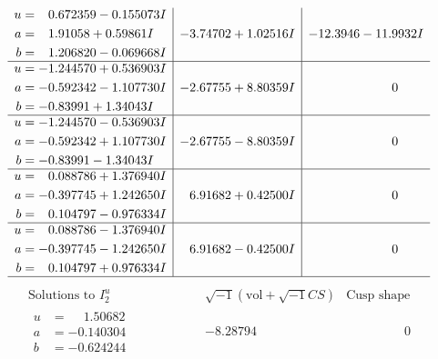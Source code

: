 \documentclass[1p]{elsarticle_modified}
\theoremstyle{definition}
\newcommand{\I}{\sqrt{-1}}
\begin{document}
$$\begin{array}{c|c|c}
\begin{aligned}
u &= \phantom{-}0.672359 - 0.155073 I \\
a &= \phantom{-}1.91058 + 0.59861 I \\
b &= \phantom{-}1.206820 - 0.069668 I\end{aligned}
 & -3.74702 + 1.02516 I & -12.3946 - 11.9932 I \\ \hline\begin{aligned}
u &= -1.244570 + 0.536903 I \\
a &= -0.592342 - 1.107730 I \\
b &= -0.83991 + 1.34043 I\end{aligned}
 & -2.67755 + 8.80359 I & \phantom{-0.000000 } 0 \\ \hline\begin{aligned}
u &= -1.244570 - 0.536903 I \\
a &= -0.592342 + 1.107730 I \\
b &= -0.83991 - 1.34043 I\end{aligned}
 & -2.67755 - 8.80359 I & \phantom{-0.000000 } 0 \\ \hline\begin{aligned}
u &= \phantom{-}0.088786 + 1.376940 I \\
a &= -0.397745 + 1.242650 I \\
b &= \phantom{-}0.104797 - 0.976334 I\end{aligned}
 & \phantom{-}6.91682 + 0.42500 I & \phantom{-0.000000 } 0 \\ \hline\begin{aligned}
u &= \phantom{-}0.088786 - 1.376940 I \\
a &= -0.397745 - 1.242650 I \\
b &= \phantom{-}0.104797 + 0.976334 I\end{aligned}
 & \phantom{-}6.91682 - 0.42500 I & \phantom{-0.000000 } 0\\
 \hline 
 \end{array}$$\newpage$$\begin{array}{c|c|c}  
\text{Solutions to }I^u_{2}& \I (\text{vol} + \sqrt{-1}CS) & \text{Cusp shape}\\
 \hline 
\begin{aligned}
u &= \phantom{-}1.50682\phantom{ +0.000000I} \\
a &= -0.140304\phantom{ +0.000000I} \\
b &= -0.624244\phantom{ +0.000000I}\end{aligned}
 & -8.28794\phantom{ +0.000000I} & \phantom{-0.000000 } 0 \\ \hline\begin{aligned}

\end{aligned}
\end{array}$$
\end{document}
